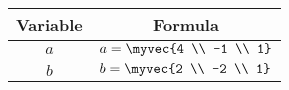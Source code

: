 \begin{center}
    \begin{tabular}{|c|c|} 
        \hline
            \textbf{Variable}  & \textbf{Formula} \\ 
        \hline
            $a$   & $a = \myvec{4 \\ -1 \\ 1}$ \\ 
        \hline
            $b$   &  $b = \myvec{2 \\ -2 \\ 1}$\\ 
        \hline
           \end{tabular}
\end{center}  
